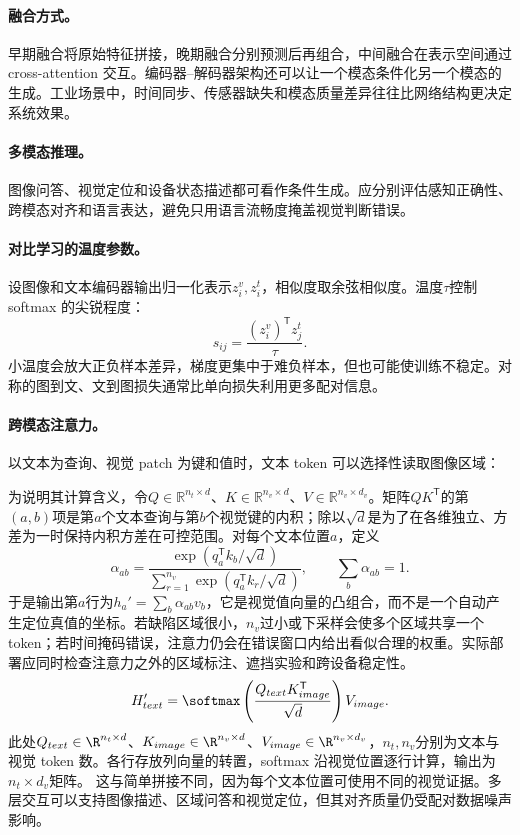 \paragraph{融合方式。}
早期融合将原始特征拼接，晚期融合分别预测后再组合，中间融合在表示空间通过 cross-attention 交互。编码器--解码器架构还可以让一个模态条件化另一个模态的生成。工业场景中，时间同步、传感器缺失和模态质量差异往往比网络结构更决定系统效果。

\paragraph{多模态推理。}
图像问答、视觉定位和设备状态描述都可看作条件生成。应分别评估感知正确性、跨模态对齐和语言表达，避免只用语言流畅度掩盖视觉判断错误。

\paragraph{对比学习的温度参数。}
设图像和文本编码器输出归一化表示$z_i^v,z_i^t$，相似度取余弦相似度。温度$\tau$控制 softmax 的尖锐程度：
\begin{equation}
 s_{ij}=\frac{(z_i^v)^{\mathsf T}z_j^t}{\tau}.
\end{equation}
小温度会放大正负样本差异，梯度更集中于难负样本，但也可能使训练不稳定。对称的图到文、文到图损失通常比单向损失利用更多配对信息。

\paragraph{跨模态注意力。}
以文本为查询、视觉 patch 为键和值时，文本 token 可以选择性读取图像区域：

为说明其计算含义，令$Q\in\mathbb R^{n_t\times d}$、$K\in\mathbb R^{n_v\times d}$、$V\in\mathbb R^{n_v\times d_v}$。矩阵$QK^{\mathsf T}$的第$(a,b)$项是第$a$个文本查询与第$b$个视觉键的内积；除以$\sqrt d$是为了在各维独立、方差为一时保持内积方差在可控范围。对每个文本位置$a$，定义
\[
\alpha_{ab}=\frac{\exp(q_a^{\mathsf T}k_b/\sqrt d)}{\sum_{r=1}^{n_v}\exp(q_a^{\mathsf T}k_r/\sqrt d)},\qquad \sum_b\alpha_{ab}=1.
\]
于是输出第$a$行为$h_a'=\sum_b\alpha_{ab}v_b$，它是视觉值向量的凸组合，而不是一个自动产生定位真值的坐标。若缺陷区域很小，$n_v$过小或下采样会使多个区域共享一个 token；若时间掩码错误，注意力仍会在错误窗口内给出看似合理的权重。实际部署应同时检查注意力之外的区域标注、遮挡实验和跨设备稳定性。
\begin{equation}
 H_{text}'=\softmax\left(\frac{Q_{text}K_{image}^{\mathsf T}}{\sqrt d}\right)V_{image}.
\end{equation}
此处$Q_{text}\in\R^{n_t\times d}$、$K_{image}\in\R^{n_v\times d}$、$V_{image}\in\R^{n_v\times d_v}$，$n_t,n_v$分别为文本与视觉 token 数。各行存放列向量的转置，softmax 沿视觉位置逐行计算，输出为$n_t\times d_v$矩阵。
这与简单拼接不同，因为每个文本位置可使用不同的视觉证据。多层交互可以支持图像描述、区域问答和视觉定位，但其对齐质量仍受配对数据噪声影响。

